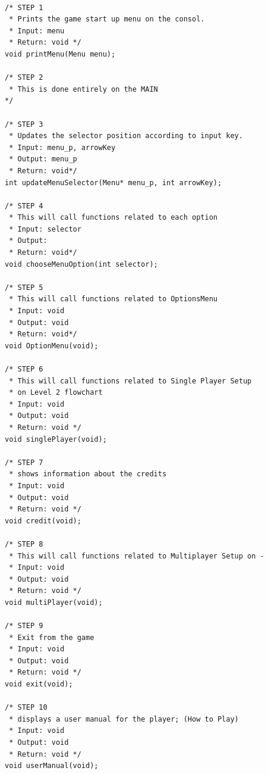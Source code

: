 \begin{lstlisting}[frame=single]

/* STEP 1
 * Prints the game start up menu on the consol.
 * Input: menu
 * Return: void */
void printMenu(Menu menu);

/* STEP 2
 * This is done entirely on the MAIN
*/

/* STEP 3
 * Updates the selector position according to input key.
 * Input: menu_p, arrowKey
 * Output: menu_p
 * Return: void*/
int updateMenuSelector(Menu* menu_p, int arrowKey);

/* STEP 4
 * This will call functions related to each option
 * Input: selector
 * Output: 
 * Return: void*/
void chooseMenuOption(int selector);

/* STEP 5
 * This will call functions related to OptionsMenu
 * Input: void
 * Output: void
 * Return: void*/
void OptionMenu(void);

/* STEP 6
 * This will call functions related to Single Player Setup 
 * on Level 2 flowchart
 * Input: void 
 * Output: void
 * Return: void */
void singlePlayer(void);

/* STEP 7
 * shows information about the credits
 * Input: void 
 * Output: void
 * Return: void */
void credit(void);

/* STEP 8
 * This will call functions related to Multiplayer Setup on -
 * Input: void 
 * Output: void
 * Return: void */
void multiPlayer(void);

/* STEP 9
 * Exit from the game
 * Input: void 
 * Output: void
 * Return: void */
void exit(void);

/* STEP 10
 * displays a user manual for the player; (How to Play)
 * Input: void 
 * Output: void
 * Return: void */
void userManual(void);

\end{lstlisting}



